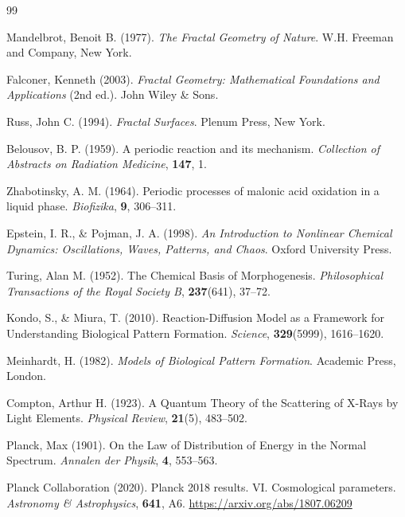\documentclass[12pt,a4paper]{article}
\begin{document}
	\begin{thebibliography}{99}
		
		Mandelbrot, Benoit B. (1977). \textit{The Fractal Geometry of Nature}. 
		W.H. Freeman and Company, New York.
		
		Falconer, Kenneth (2003). \textit{Fractal Geometry: Mathematical Foundations and Applications} (2nd ed.). 
		John Wiley \& Sons.
		
		Russ, John C. (1994). \textit{Fractal Surfaces}. 
		Plenum Press, New York.
		
		Belousov, B. P. (1959). A periodic reaction and its mechanism. 
		\textit{Collection of Abstracts on Radiation Medicine}, \textbf{147}, 1.
		
		Zhabotinsky, A. M. (1964). Periodic processes of malonic acid oxidation in a liquid phase. 
		\textit{Biofizika}, \textbf{9}, 306--311.
		
		Epstein, I. R., \& Pojman, J. A. (1998). \textit{An Introduction to Nonlinear Chemical Dynamics: Oscillations, Waves, Patterns, and Chaos}. 
		Oxford University Press.
		
		Turing, Alan M. (1952). The Chemical Basis of Morphogenesis. 
		\textit{Philosophical Transactions of the Royal Society B}, \textbf{237}(641), 37--72.
		
		Kondo, S., \& Miura, T. (2010). Reaction-Diffusion Model as a Framework for Understanding Biological Pattern Formation. 
		\textit{Science}, \textbf{329}(5999), 1616--1620.
		
		Meinhardt, H. (1982). \textit{Models of Biological Pattern Formation}. 
		Academic Press, London.
		
		Compton, Arthur H. (1923). A Quantum Theory of the Scattering of X-Rays by Light Elements. 
		\textit{Physical Review}, \textbf{21}(5), 483--502.
		
		Planck, Max (1901). On the Law of Distribution of Energy in the Normal Spectrum. 
		\textit{Annalen der Physik}, \textbf{4}, 553--563.
		
		Planck Collaboration (2020). Planck 2018 results. VI. Cosmological parameters. 
		\textit{Astronomy \& Astrophysics}, \textbf{641}, A6.
		\href{https://arxiv.org/abs/1807.06209}{https://arxiv.org/abs/1807.06209}
		

\end{thebibliography}
\end{document}
